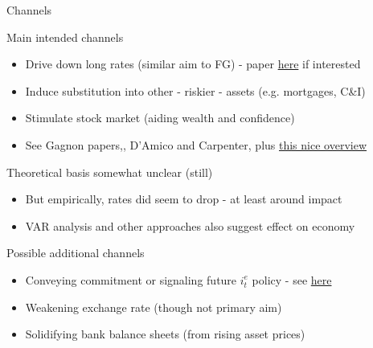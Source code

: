 \begin{frame}{Channels}

Main intended channels
	\begin{itemize}
	\item	Drive down long rates (similar aim to FG) - paper \href{https://academic.oup.com/ej/article/122/564/F385/5079473}{here} if interested
	\item	Induce substitution into other - riskier - assets (e.g. mortgages, C\&I)
	\item	Stimulate stock market (aiding wealth and confidence)
	\item	See Gagnon papers,, D'Amico and Carpenter, plus \href{https://www.piie.com/system/files/documents/pb18-19.pdf}{this nice overview}
	\end{itemize}
\vspace{2mm}
Theoretical basis somewhat unclear (still)
	\begin{itemize}
	\item	But empirically, rates did seem to drop - at least around impact
	\item	VAR analysis and other approaches also suggest effect on economy
	\end{itemize}
\vspace{2mm}
Possible additional channels
	\begin{itemize}
	\item	Conveying commitment or signaling future $i_{t}^{e}$ policy - see \href{https://www.ijcb.org/journal/ijcb14q3a7.htm}{here}
	\item	Weakening exchange rate (though not primary aim)
	\item	Solidifying bank balance sheets (from rising asset prices)
	\end{itemize}

\end{frame}


	
